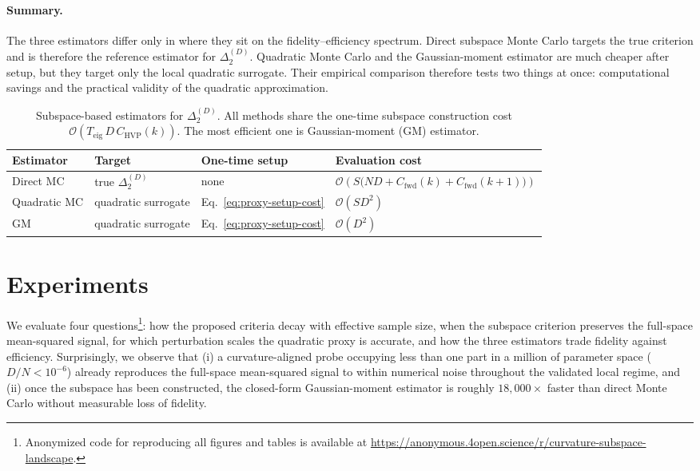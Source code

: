 \documentclass{article}
\begin{document}
\paragraph{Summary.}
The three estimators differ only in where they sit on the fidelity--efficiency spectrum.
Direct subspace Monte Carlo targets the true criterion and is therefore the reference estimator for $\Delta_2^{(D)}$.
Quadratic Monte Carlo and the Gaussian-moment estimator are much cheaper after setup, but they target only the local quadratic surrogate.
Their empirical comparison therefore tests two things at once: computational savings and the practical validity of the quadratic approximation.

\begin{table}[t]
\caption{Subspace-based estimators for $\Delta_2^{(D)}$. All methods share the one-time subspace construction cost $\mathcal O(T_{\mathrm{eig}}\,D\,C_{\mathrm{HVP}}(k))$. The most efficient one is Gaussian-moment (GM) estimator.}
\label{tab:estimator-summary}
\begin{center}
\small
\begin{tabular}{p{1.8cm} p{2.4cm} p{2.1cm} p{5.0cm}}
\toprule
\textbf{Estimator} & \textbf{Target} & \textbf{One-time setup} & \textbf{Evaluation cost} \\
\midrule
Direct MC
&
true $\Delta_2^{(D)}$
&
none
&
$\mathcal O\!\left(S\bigl(ND + C_{\mathrm{fwd}}(k)+C_{\mathrm{fwd}}(k+1)\bigr)\right)$
\\[0.45em]

Quadratic MC
&
quadratic surrogate
&
Eq.~\eqref{eq:proxy-setup-cost}
&
$\mathcal O(SD^2)$
\\[0.45em]

GM
&
quadratic surrogate
&
Eq.~\eqref{eq:proxy-setup-cost}
&
$\mathcal O(D^2)$
\\
\bottomrule
\end{tabular}
\end{center}
\end{table}

\section{Experiments}\label{sec:experiments}

We evaluate four questions\footnote{Anonymized code for reproducing all figures and tables is available at \url{https://anonymous.4open.science/r/curvature-subspace-landscape}.}: how the proposed criteria decay with effective sample size, when the subspace criterion preserves the full-space mean-squared signal, for which perturbation scales the quadratic proxy is accurate, and how the three estimators trade fidelity against efficiency. Surprisingly, we observe that (i) a curvature-aligned probe occupying less than one part in a million of parameter space ($D/N < 10^{-6}$) already reproduces the full-space mean-squared signal to within numerical noise throughout the validated local regime, and (ii) once the subspace has been constructed, the closed-form Gaussian-moment estimator is roughly $18{,}000\times$ faster than direct Monte Carlo without measurable loss of fidelity.
\end{document}
